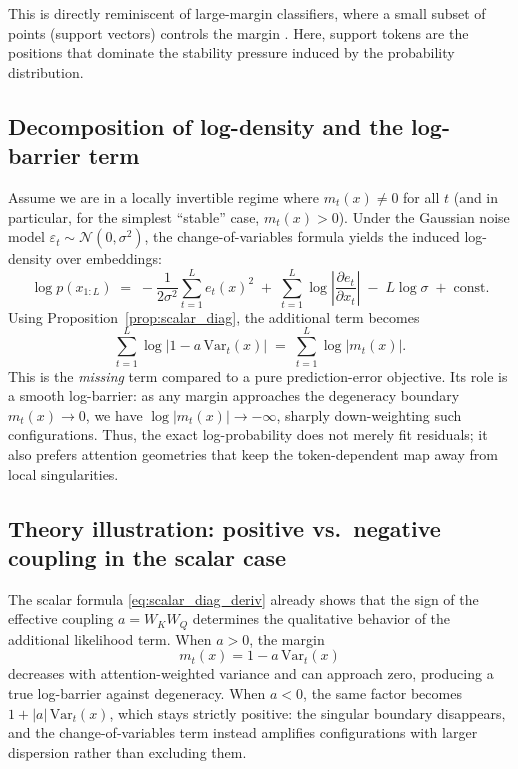 \documentclass[11pt]{article}
\begin{document}
This is directly reminiscent of large-margin classifiers, where a small subset of points (support vectors) controls the margin \citep{CortesVa95}. Here, support tokens are the positions that dominate the stability pressure induced by the probability distribution.

\subsection{Decomposition of log-density and the log-barrier term}
\label{subsec:scalar_likelihood}

Assume we are in a locally invertible regime where $m_t(x)\neq 0$ for all $t$ (and in particular, for the simplest ``stable'' case, $m_t(x)>0$).
Under the Gaussian noise model $\varepsilon_t \sim \mathcal{N}(0,\sigma^2)$, the change-of-variables formula \citep{PapamakariosNaReMoLa21} yields the induced log-density over embeddings:
\begin{equation}
\log p(x_{1:L})
\;=\;
-\frac{1}{2\sigma^2}\sum_{t=1}^L e_t(x)^2
\;+\;
\sum_{t=1}^L \log\left| \frac{\partial e_t}{\partial x_t}\right|
\;-\;
L\log\sigma
\;+\; \mathrm{const}.
\label{eq:scalar_loglik_decomp}
\end{equation}
Using Proposition~\ref{prop:scalar_diag}, the additional term becomes
\begin{equation}
\sum_{t=1}^L \log\left| 1 - a\,\mathrm{Var}_t(x)\right|
\;=\;
\sum_{t=1}^L \log|m_t(x)|.
\label{eq:scalar_logdet_margin}
\end{equation}
This is the \emph{missing} term compared to a pure prediction-error objective.
Its role is a smooth log-barrier: as any margin approaches the degeneracy boundary $m_t(x)\to 0$, we have $\log|m_t(x)|\to -\infty$, sharply down-weighting such configurations.
Thus, the exact log-probability does not merely fit residuals; it also prefers attention geometries that keep the token-dependent map away from local singularities.

\subsection{Theory illustration: positive vs.\ negative coupling in the scalar case}
\label{subsec:theory_illustration_scalar}

The scalar formula \eqref{eq:scalar_diag_deriv} already shows that the sign of the effective coupling
$a=W_KW_Q$ determines the qualitative behavior of the additional likelihood term.
When $a>0$, the margin
\[
m_t(x)=1-a\,\mathrm{Var}_t(x)
\]
decreases with attention-weighted variance and can approach zero, producing a true
log-barrier against degeneracy.
When $a<0$, the same factor becomes $1+|a|\,\mathrm{Var}_t(x)$, which stays strictly positive:
the singular boundary disappears, and the change-of-variables term instead amplifies configurations
with larger dispersion rather than excluding them.
\end{document}
